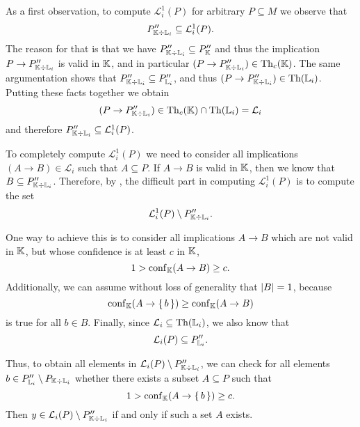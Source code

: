 As a first observation, to compute $\mathcal{L}_{i}^{1}(P)$ for arbitrary $P \subseteq M$
we observe that
\begin{equation}
  \label{eq:41}
  P_{{\mathbb{K}} \div {\ensuremath{\mathbb{L}}}_{i}}'' \subseteq \mathcal{L}_{i}^{1}(P).
\end{equation}
The reason for that is that we have $P_{{\mathbb{K}} \div {\ensuremath{\mathbb{L}}}_{i}}'' \subseteq P_{{\mathbb{K}}}''$
and thus the implication $P \to P_{{\mathbb{K}} \div {\ensuremath{\mathbb{L}}}_{i}}''$ is valid in ${\mathbb{K}}$, and in
particular $(P \to P_{{\mathbb{K}} \div {\ensuremath{\mathbb{L}}}_{i}}'') \in \operatorname{Th}_{c}({\mathbb{K}})$.  The same
argumentation shows that $P_{{\mathbb{K}} \div {\ensuremath{\mathbb{L}}}_{i}}'' \subseteq P_{{\mathbb{L}}_{i}}''$, and
thus $(P \to P_{{\mathbb{K}} \div {\ensuremath{\mathbb{L}}}_{i}}'') \in \operatorname{Th}({\mathbb{L}}_{i})$.  Putting these facts
together we obtain
\begin{equation*}
  (P \to P_{{\mathbb{K}} \div {\ensuremath{\mathbb{L}}}_{i}}'') \in \operatorname{Th}_{c}({\mathbb{K}}) \cap \operatorname{Th}({\mathbb{L}}_{i}) = \mathcal{L}_{i}
\end{equation*}
and therefore $P_{{\mathbb{K}} \div {\ensuremath{\mathbb{L}}}_{i}}'' \subseteq \mathcal{L}_{i}^{1}(P)$.

To completely compute $\mathcal{L}_{i}^{1}(P)$ we need to consider all implications $(A
\to B) \in \mathcal{L}_{i}$ such that $A \subseteq P$.  If $A \to B$ is valid in ${\mathbb{K}}$,
then we know that $B \subseteq P_{{\mathbb{K}} \div {\ensuremath{\mathbb{L}}}_{i}}''$.  Therefore, by ,
the difficult part in computing $\mathcal{L}_{i}^{1}(P)$ is to compute the set
\begin{equation*}
  \mathcal{L}_{i}^{1}(P) \setminus P_{{\mathbb{K}} \div {\ensuremath{\mathbb{L}}}_{i}}''.
\end{equation*}

One way to achieve this is to consider all implications $A \to B$ which are not valid in
${\mathbb{K}}$, but whose confidence is at least $c$ in ${\mathbb{K}}$, \ie
\begin{equation*}
  1 > \operatorname{conf}_{{\mathbb{K}}}(A \to B) \ge c.
\end{equation*}
Additionally, we can assume without loss of generality that $\lvert B\rvert = 1$, because
\begin{equation*}
  \operatorname{conf}_{{\mathbb{K}}}(A \to {\ensuremath{\{\, b \,\}}}) \ge \operatorname{conf}_{{\mathbb{K}}}(A \to B)
\end{equation*}
is true for all $b \in B$.  Finally, since $\mathcal{L}_{i} \subseteq \operatorname{Th}({\mathbb{L}}_{i})$, we
also know that
\begin{equation*}
  \mathcal{L}_{i}(P) \subseteq P_{{\mathbb{L}}_{i}}''.
\end{equation*}

Thus, to obtain all elements in $\mathcal{L}_{i}(P) \setminus P_{{\mathbb{K}} \div {\ensuremath{\mathbb{L}}}_{i}}''$, we can check for all elements $b \in P_{{\mathbb{L}}_{i}}'' \setminus P_{{\mathbb{K}}
  \div {\ensuremath{\mathbb{L}}}_{i}}$ whether there exists a subset $A \subseteq P$ such that
\begin{equation*}
  1 > \operatorname{conf}_{{\mathbb{K}}}(A \to {\ensuremath{\{\, b \,\}}}) \ge c.
\end{equation*}
Then $y \in \mathcal{L}_{i}(P) \setminus P_{{\mathbb{K}} \div {\ensuremath{\mathbb{L}}}_{i}}''$ if and only if such a
set $A$ exists.


